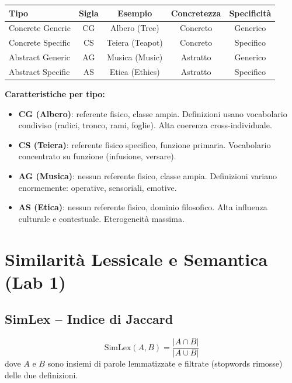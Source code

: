 \documentclass[12pt,a4paper]{article}
\begin{document}
\begin{center}
\begin{tabular}{lcccc}
\toprule
\textbf{Tipo} & \textbf{Sigla} & \textbf{Esempio} & \textbf{Concretezza} & \textbf{Specificit\`a}\\
\midrule
Concrete Generic   & CG & Albero (Tree)  & Concreto  & Generico \\
Concrete Specific  & CS & Teiera (Teapot) & Concreto  & Specifico \\
Abstract Generic   & AG & Musica (Music)  & Astratto  & Generico \\
Abstract Specific  & AS & Etica (Ethics)  & Astratto  & Specifico \\
\bottomrule
\end{tabular}
\end{center}

\begin{defbox}
\textbf{Caratteristiche per tipo:}
\begin{itemize}
  \item \textbf{CG (Albero)}: referente fisico, classe ampia. Definizioni usano vocabolario condiviso (radici, tronco, rami, foglie). Alta coerenza cross-individuale.
  \item \textbf{CS (Teiera)}: referente fisico specifico, funzione primaria. Vocabolario concentrato su funzione (infusione, versare).
  \item \textbf{AG (Musica)}: nessun referente fisico, classe ampia. Definizioni variano enormemente: operative, sensoriali, emotive.
  \item \textbf{AS (Etica)}: nessun referente fisico, dominio filosofico. Alta influenza culturale e contestuale. Eterogeneit\`a massima.
\end{itemize}
\end{defbox}

\section{Similarit\`a Lessicale e Semantica (Lab 1)}

\subsection{SimLex -- Indice di Jaccard}\label{sec:simlex}

\begin{formulabox}
\[
\text{SimLex}(A, B) = \frac{|A \cap B|}{|A \cup B|}
\]
dove $A$ e $B$ sono insiemi di parole lemmatizzate e filtrate (stopwords rimosse) delle due definizioni.
\end{formulabox}
\end{document}
